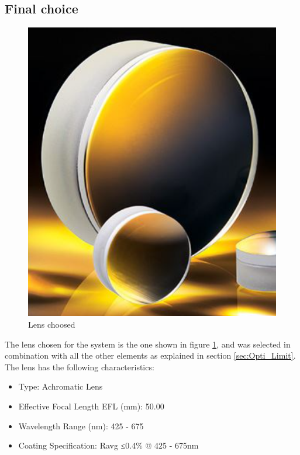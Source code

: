 \subsection{Final choice}
\begin{figure}[H]
    \centering
    \includegraphics[scale=0.7]{assets/figures/Mechanical Design/Lentille.png}
    \caption{Lens choosed}
    \label{fig:Opti_Lens}
\end{figure}
The lens chosen for the system is the one shown in figure \ref{fig:Opti_Lens}, and was selected in combination with all
the other elements as explained in section \ref{sec:Opti_Limit}. The lens has the following characteristics:
\begin{itemize}
    \item Type: Achromatic Lens
    \item Effective Focal Length EFL (mm): 50.00
    \item Wavelength Range (nm): 425 - 675
    \item Coating Specification: Ravg ≤0.4\% @ 425 - 675nm
\end{itemize}
\newpage
